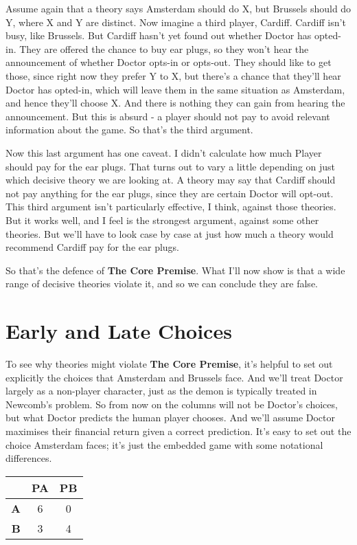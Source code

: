 \documentclass[
  12pt,
]{article}
\begin{document}
Assume again that a theory says Amsterdam should do X, but Brussels
should do Y, where X and Y are distinct. Now imagine a third player,
Cardiff. Cardiff isn't busy, like Brussels. But Cardiff hasn't yet found
out whether Doctor has opted-in. They are offered the chance to buy ear
plugs, so they won't hear the announcement of whether Doctor opts-in or
opts-out. They should like to get those, since right now they prefer Y
to X, but there's a chance that they'll hear Doctor has opted-in, which
will leave them in the same situation as Amsterdam, and hence they'll
choose X. And there is nothing they can gain from hearing the
announcement. But this is absurd - a player should not pay to avoid
relevant information about the game. So that's the third argument.

Now this last argument has one caveat. I didn't calculate how much
Player should pay for the ear plugs. That turns out to vary a little
depending on just which decisive theory we are looking at. A theory may
say that Cardiff should not pay anything for the ear plugs, since they
are certain Doctor will opt-out. This third argument isn't particularly
effective, I think, against those theories. But it works well, and I
feel is the strongest argument, against some other theories. But we'll
have to look case by case at just how much a theory would recommend
Cardiff pay for the ear plugs.

So that's the defence of \textbf{The Core Premise}. What I'll now show
is that a wide range of decisive theories violate it, and so we can
conclude they are false.

\hypertarget{early-and-late-choices}{%
\section{Early and Late Choices}\label{early-and-late-choices}}

To see why theories might violate \textbf{The Core Premise}, it's
helpful to set out explicitly the choices that Amsterdam and Brussels
face. And we'll treat Doctor largely as a non-player character, just as
the demon is typically treated in Newcomb's problem. So from now on the
columns will not be Doctor's choices, but what Doctor predicts the human
player chooses. And we'll assume Doctor maximises their financial return
given a correct prediction. It's easy to set out the choice Amsterdam
faces; it's just the embedded game with some notational differences.

\begin{table}[H]
\centering
\begin{tabular}[t]{>{}r|cc}

\textbf{ } & \textbf{PA} & \textbf{PB}\\
\midrule
\textbf{A} & 6 & 0\\
\textbf{B} & 3 & 4\\

\end{tabular}
\end{table}
\end{document}
